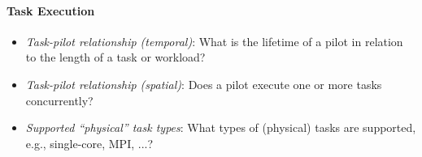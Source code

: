 \documentclass{sig-alternate}
\begin{document}
\paragraph{Task Execution}

\begin{itemize}

  \item \textit{Task-pilot relationship (temporal)}: What is the lifetime of a pilot in relation to the 
    length of a task or workload?  

  \item \textit{Task-pilot relationship (spatial)}: Does a pilot execute one or more tasks concurrently? 

  \item \textit{Supported ``physical'' task types}: What types of (physical) tasks are supported, e.g., single-core, MPI, ...?

\end{itemize}









\end{document}
